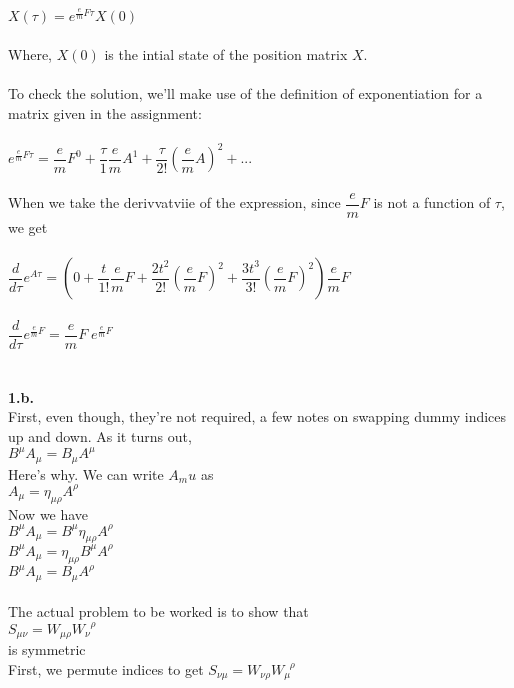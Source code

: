 \documentclass[prb,preprint]
{revtex4-1}
\newcommand{\PRLsep}{\noindent\makebox[\linewidth]{\resizebox{0.8888\linewidth}{2pt}{$\bullet$}}\bigskip}
\begin{document}
\\
\\
$X\left(\tau\right) = e^{\frac{e}{m}F\tau}X\left(0\right)$
\\
\\
Where, $X\left(0\right)$ is the intial state of the position matrix $X$.  
\\
\\
To check the solution, we'll make use of the definition of exponentiation for a matrix given in the assignment:
\\
\\
$e^{\frac{e}{m}F\tau} = \dfrac{e}{m}F^0 + \dfrac{\tau}{1}\dfrac{e}{m}A^1 + \dfrac{\tau}{2!}\left(\dfrac{e}{m}A\right)^2 + ...$
\\
\\
When we take the derivvatviie of the expression, since $\dfrac{e}{m}F$ is not a function of $\tau$, we get
\\
\\
$\dfrac{d}{d\tau} e^{A\tau} = \left(0 + \dfrac{t}{1!}\dfrac{e}{m}F + \dfrac{2t^2}{2!}\left(\dfrac{e}{m}F\right)^2 + \dfrac{3t^3}{3!}\left(\dfrac{e}{m}F\right)^2\right)\dfrac{e}{m}F$
\\
\\
$\dfrac{d}{d\tau} e^{\frac{e}{m}F} = \dfrac{e}{m}F\;e^{\frac{e}{m}F}$ 
\\
\\
\PRLsep
\\
\textbf{1.b.}
\\
First, even though, they're not required, a few notes on swapping dummy indices up and down.  As it turns out,
\\
$B^\mu A_\mu = B_\mu A^\mu$
\\
Here's why.  We can write $A_mu$ as
\\
$A_\mu = \eta_{\mu\rho}A^\rho$
\\
Now we have
\\
$B^\mu A_\mu = B^\mu \eta_{\mu\rho} A^\rho$
\\
$B^\mu A_\mu = \eta_{\mu\rho} B^\mu A^\rho$
\\
$B^\mu A_\mu = B_\mu A^\rho$
\\
\\
The actual problem to be worked is to show that
\\
$S_{\mu\nu} = W_{\mu\rho}W_\nu^{\;\;\rho}$
\\
is symmetric
\\
First, we permute indices to get
$S_{\nu\mu} = W_{\nu\rho}W_\mu^{\;\;\rho}$
\\
\end{document}

